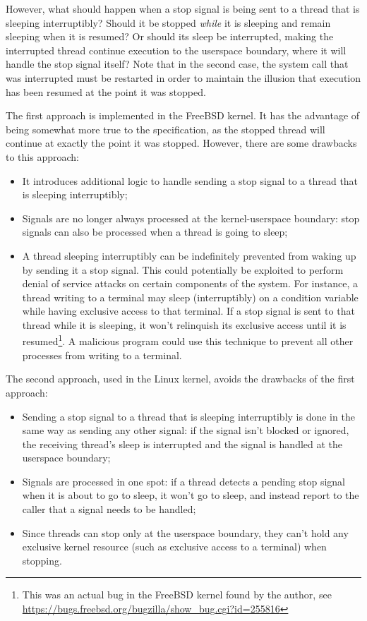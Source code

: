 \documentclass[shortabstract, manyadvisors, english, mgr]{iithesis}
\begin{document}
However, what should happen when a stop signal is being sent to a thread that is
sleeping interruptibly? Should it be stopped \textit{while} it is sleeping and
remain sleeping when it is resumed? Or should its sleep be interrupted, making
the interrupted thread continue execution to the userspace boundary, where it
will handle the stop signal itself? Note that in the second case, the system
call that was interrupted must be restarted in order to maintain the illusion
that execution has been resumed at the point it was stopped.

The first approach is implemented in the FreeBSD kernel. It has the advantage of
being somewhat more true to the specification, as the stopped thread will
continue at exactly the point it was stopped. However, there are some drawbacks
to this approach:
\begin{itemize}
\item It introduces additional logic to handle sending a stop signal to a thread
  that is sleeping interruptibly;
\item Signals are no longer always processed at the kernel-userspace boundary:
  stop signals can also be processed when a thread is going to sleep;
\item A thread sleeping interruptibly can be indefinitely prevented from waking
  up by sending it a stop signal. This could potentially be exploited to perform
  denial of service attacks on certain components of the system. For instance, a
  thread writing to a terminal may sleep (interruptibly) on a condition variable
  while having exclusive access to that terminal. If a stop signal is sent to
  that thread while it is sleeping, it won't relinquish its exclusive access
  until it is resumed\footnote{This was an actual bug in the FreeBSD kernel
    found by the author, see\\
    \url{https://bugs.freebsd.org/bugzilla/show_bug.cgi?id=255816}}. A malicious
  program could use this technique to prevent all other processes from writing
  to a terminal.
\end{itemize}

The second approach, used in the Linux kernel, avoids the drawbacks of the first
approach:
\begin{itemize}
\item Sending a stop signal to a thread that is sleeping interruptibly is done
  in the same way as sending any other signal: if the signal isn't blocked or
  ignored, the receiving thread's sleep is interrupted and the signal is handled
  at the userspace boundary;
\item Signals are processed in one spot: if a thread detects a pending stop
  signal when it is about to go to sleep, it won't go to sleep, and instead
  report to the caller that a signal needs to be handled;
\item Since threads can stop only at the userspace boundary, they can't hold any
  exclusive kernel resource (such as exclusive access to a terminal) when
  stopping.
\end{itemize}
\end{document}
